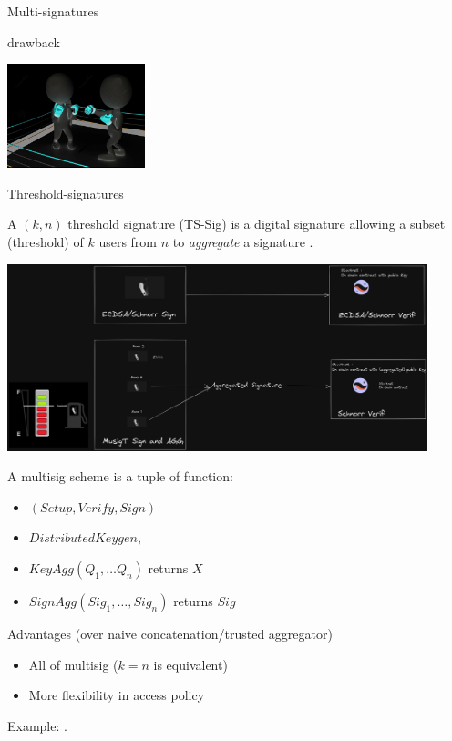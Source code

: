 \documentclass[aspectratio=43]{beamer}
\begin{document}
\begin{frame}{Multi-signatures}
{\begin{alertblock}{drawback}
\begin{itemize}
\begin{center}
  \includegraphics[width=4cm]{images/rounds.jpg}
  \end{center}
  \end{itemize}
  \end{alertblock}
  } 
 
 \end{frame}
 

 
\begin{frame}{Threshold-signatures}


 
  {
   A $(k,n)$ threshold signature (TS-Sig) is a digital signature allowing a subset (threshold) of $k$ users from $n$ to {\it aggregate} a signature . 
 
   \begin{center}
        \includegraphics[width=12.2cm]{images/threshold.png}
        \end{center}
  }
  {
    \begin{definition}
     A multisig scheme is a tuple of function:
     \begin{itemize}
     \item $(Setup,  Verify, Sign)$
     \item $Distributed Keygen$,
     \item $KeyAgg(Q_1, \ldots Q_n)$ returns $X$
     \item $SignAgg(Sig_1, \ldots, Sig_n)$ returns $Sig$
     \end{itemize}
  \end{definition}
  }
  {
  \begin{exampleblock}{Advantages (over naive concatenation/trusted aggregator)}
  \begin{itemize}
  \item All of multisig ($k=n$ is equivalent)
  \item More flexibility in access policy
  \end{itemize}
  \end{exampleblock}
  Example: \href{https://eprint.iacr.org/2020/852}{}.
  } 
   
\end{frame}
\end{document}
